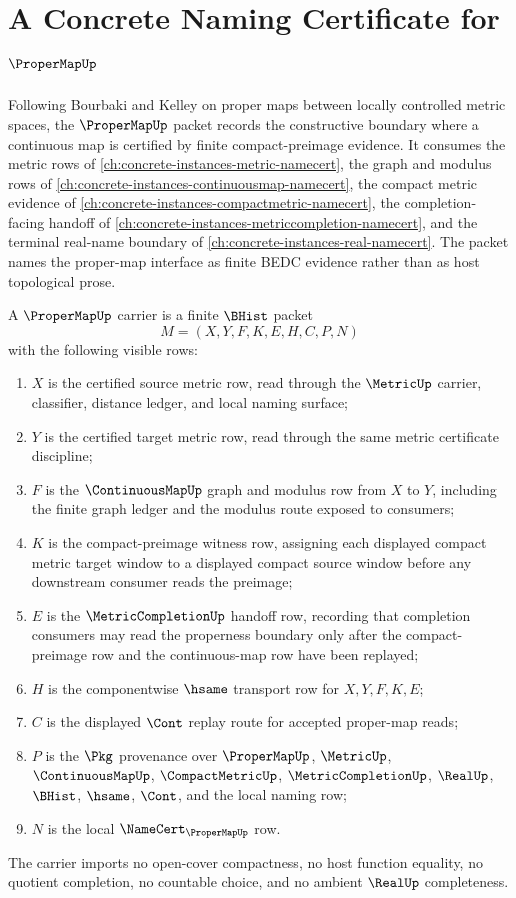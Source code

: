\chapter{A Concrete Naming Certificate for $\ProperMapUp$}
\label{ch:concrete-instances-proper-map-namecert}

Following Bourbaki and Kelley on proper maps between locally controlled metric
spaces, the $\ProperMapUp$ packet records the constructive boundary where a
continuous map is certified by finite compact-preimage evidence. It consumes
the metric rows of \autoref{ch:concrete-instances-metric-namecert}, the graph
and modulus rows of \autoref{ch:concrete-instances-continuousmap-namecert}, the
compact metric evidence of \autoref{ch:concrete-instances-compactmetric-namecert},
the completion-facing handoff of
\autoref{ch:concrete-instances-metriccompletion-namecert}, and the terminal
real-name boundary of \autoref{ch:concrete-instances-real-namecert}. The packet
names the proper-map interface as finite BEDC evidence rather than as host
topological prose.

\begin{definition}
\label{def:proper-map-carrier}
A $\ProperMapUp$ carrier is a finite $\BHist$ packet
$$
M=(X,Y,F,K,E,H,C,P,N)
$$
with the following visible rows:
\begin{enumerate}
\item $X$ is the certified source metric row, read through the $\MetricUp$
carrier, classifier, distance ledger, and local naming surface;
\item $Y$ is the certified target metric row, read through the same metric
certificate discipline;
\item $F$ is the $\ContinuousMapUp$ graph and modulus row from $X$ to $Y$,
including the finite graph ledger and the modulus route exposed to consumers;
\item $K$ is the compact-preimage witness row, assigning each displayed compact
metric target window to a displayed compact source window before any downstream
consumer reads the preimage;
\item $E$ is the $\MetricCompletionUp$ handoff row, recording that completion
consumers may read the properness boundary only after the compact-preimage row
and the continuous-map row have been replayed;
\item $H$ is the componentwise $\hsame$ transport row for $X,Y,F,K,E$;
\item $C$ is the displayed $\Cont$ replay route for accepted proper-map reads;
\item $P$ is the $\Pkg$ provenance over $\ProperMapUp$, $\MetricUp$,
$\ContinuousMapUp$, $\CompactMetricUp$, $\MetricCompletionUp$, $\RealUp$,
$\BHist$, $\hsame$, $\Cont$, and the local naming row;
\item $N$ is the local $\NameCert_{\ProperMapUp}$ row.
\end{enumerate}
The carrier imports no open-cover compactness, no host function equality, no
quotient completion, no countable choice, and no ambient $\RealUp$
completeness.
\end{definition}

